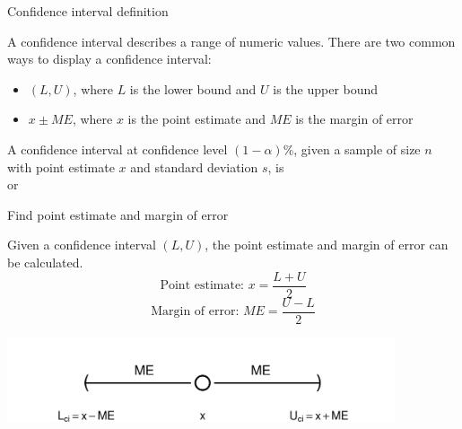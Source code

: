 \documentclass[xcolor=table, aspectratio=169, bigger, handout]{beamer}
\begin{document}
\begin{frame}{Confidence interval definition}

\begin{block}{}
A confidence interval describes a range of numeric values. There are two common ways to display a confidence interval:
\begin{itemize}
\item $(L, U)$, where $L$ is the lower bound and $U$ is the upper bound
\item $x \pm ME$, where $x$ is the point estimate and $ME$ is the margin of error
\end{itemize}
\end{block}

\pause
\begin{block}{}
A confidence interval at confidence level $(1-\alpha)$\%, given a sample of size $n$ with point estimate $x$ and standard deviation $s$, is\\ \smallskip
{}
\pause or \\ \smallskip
{}
\end{block}

\end{frame}

\begin{frame}{Find point estimate and margin of error}
\begin{block}{}
Given a confidence interval $(L, U)$, the point estimate and margin of error can be calculated.
\[\text{Point estimate: } x = \frac {L + U}{2}\]
\[\text{Margin of error: } ME = \frac {U - L}{2}\]
\end{block}

\medskip
{\centering
\includegraphics[width=4.5in]{../images/ch7_ci_numline}
\par}

\end{frame}
\end{document}
